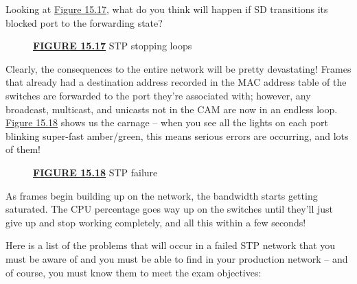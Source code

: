 Looking at \protect\hyperlink{c15.xhtmlux5cux23figure15-17}{Figure
15.17}, what do you think will happen if SD transitions its blocked port
to the forwarding state?

\begin{figure}
\centering
\caption{{\protect\hyperlink{c15.xhtmlux5cux23figureanchor15-17}{\textbf{FIGURE
15.17}} STP stopping loops}}
\end{figure}

Clearly, the consequences to the entire network will be pretty
devastating! Frames that already had a destination address recorded in
the MAC address table of the switches are forwarded to the port they're
associated with; however, any broadcast, multicast, and unicasts not in
the CAM are now in an endless loop.
\protect\hyperlink{c15.xhtmlux5cux23figure15-18}{Figure 15.18} shows us
the carnage -- when you see all the lights on each port blinking
super-fast amber/green, this means serious errors are occurring, and
lots of them!

\begin{figure}
\centering
\caption{{\protect\hyperlink{c15.xhtmlux5cux23figureanchor15-18}{\textbf{FIGURE
15.18}} STP failure}}
\end{figure}

As frames begin
building up on the network, the bandwidth starts getting saturated. The
CPU percentage goes way up on the switches until they'll just give up
and stop working completely, and all this within a few seconds!

Here is a list of the problems that will occur in a failed STP network
that you must be aware of and you must be able to find in your
production network -- and of course, you must know them to meet the exam
objectives:

